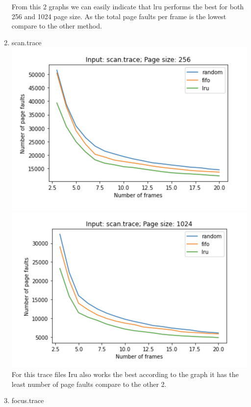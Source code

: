 \documentclass[a4paper, 11pt]{article}
\begin{document}
\begin{enumerate}
	From this 2 graphs we can easily indicate that lru performs the best for both 256 and 1024 page size. As the total page faults per frame is the lowest compare to the other method.
	\item scan.trace\\
	\includegraphics[width=\textwidth]{scanTrace256.png}\\
	\includegraphics[width=\textwidth]{scanTrace1024.png}\\
	For this trace files Iru also works the best according to the graph it has the least number of page faults compare to the other 2.
	\item focus.trace\\

\end{enumerate}
\end{document}
